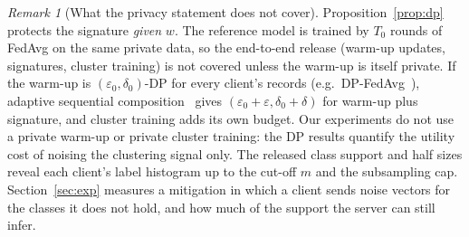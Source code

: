 \documentclass[11pt]{article}
\theoremstyle{definition}
\theoremstyle{remark}
\newtheorem{remark}{Remark}
\begin{document}
\begin{remark}[What the privacy statement does not cover]\label{rem:dp}
Proposition~\ref{prop:dp} protects the signature \emph{given} $w$. The reference model is trained by $T_0$ rounds of FedAvg on the same private data, so the end-to-end release (warm-up updates, signatures, cluster training) is not covered unless the warm-up is itself private. If the warm-up is $(\varepsilon_0,\delta_0)$-DP for every client's records (e.g.\ DP-FedAvg~\citep{mcmahan2018dpfedavg}), adaptive sequential composition~\citep{dwork2014dp} gives $(\varepsilon_0+\varepsilon,\delta_0+\delta)$ for warm-up plus signature, and cluster training adds its own budget. Our experiments do not use a private warm-up or private cluster training: the DP results quantify the utility cost of noising the clustering signal only. The released class support and half sizes reveal each client's label histogram up to the cut-off $m$ and the subsampling cap. Section~\ref{sec:exp} measures a mitigation in which a client sends noise vectors for the classes it does not hold, and how much of the support the server can still infer.
\end{remark}
\end{document}
